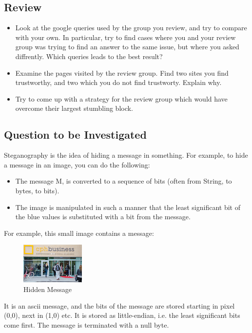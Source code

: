 \documentclass[11pt,a4paper]{article}
\begin{document}
\subsection{Review}

\begin{itemize}
\item Look at the google queries used by the group you review, and try to compare with your own. In particular, try to find cases where you and your review group was trying to find an answer to the same issue, but where you asked diffrently. Which queries leads to the best result?
\item Examine the pages visited by the review group. Find two sites you find trustworthy, and two which you do not find trustworty. Explain why.
\item Try to come up with a strategy for the review group which would have overcome their largest stumbling block.
\end{itemize}

\subsection{Question to be Investigated}

Steganography is the idea of hiding a message in something. For example, to hide a message in an image, you can do the following:

\begin{itemize}
\item The message M, is converted to a sequence of bits (often from String, to bytes, to bits).
\item The image is manipulated in such a manner that the least significant bit of the blue values is substituted with a bit from the message.
\end{itemize}
For example, this small image contains a message:

\begin{figure}[h]
\centering
\includegraphics{steganography_image.png}
\caption{Hidden Message}\label{fig:prettypic}
\end{figure}

It is an ascii message, and the bits of the message are stored starting in pixel (0,0), next in (1,0) etc. It is stored as little-endian, i.e. the least significant bits come first. The message is terminated with a null byte.\\
\end{document}
